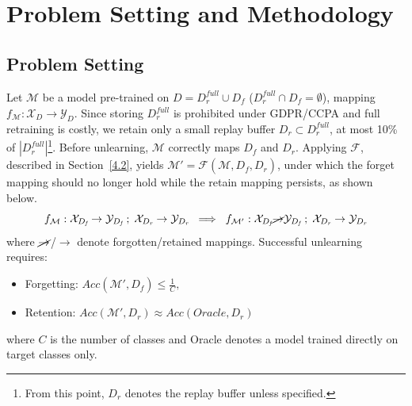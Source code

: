 
\section{Problem Setting and Methodology}
\label{sec:4}

\subsection{Problem Setting}
Let $\mathcal{M}$ be a model pre-trained on $D = D_\textit{r}^{\textit{full}} \cup D_\textit{f}$ ($D_\textit{r}^{\textit{full}} \cap D_\textit{f} = \emptyset$), mapping $f_\mathcal{M} : \mathcal{X}_D \rightarrow \mathcal{Y}_D$. Since storing $D_\textit{r}^{\textit{full}}$ is prohibited under GDPR/CCPA and full retraining is costly, we retain only a small replay buffer $D_\textit{r} \subset D_\textit{r}^{\textit{full}}$, at most 10\% of $|D_\textit{r}^{\textit{full}}|$\footnote{From this point, $D_\textit{r}$ denotes the replay buffer unless specified.}. Before unlearning, $\mathcal{M}$ correctly maps $D_\textit{f}$ and $D_\textit{r}$. Applying $\mathcal{F}$, described in Section~\ref{4.2}, yields $\mathcal{M}' = \mathcal{F}(\mathcal{M}, D_\textit{f}, D_\textit{r})$, under which the forget mapping should no longer hold while the retain mapping persists, as shown below.
{\small
\begin{equation}
f_{\mathcal{M}} :
\mathcal{X}_{D_\textit{f}} \rightarrow \mathcal{Y}_{D_\textit{f}} \; ; \;
\mathcal{X}_{D_\textit{r}} \rightarrow \mathcal{Y}_{D_\textit{r}}
\;\;\Longrightarrow\;\;
f_{\mathcal{M}'} :
\mathcal{X}_{D_\textit{f}} \cancel{\rightarrow} \mathcal{Y}_{D_\textit{f}} \; ; \;
\mathcal{X}_{D_\textit{r}} \rightarrow \mathcal{Y}_{D_\textit{r}}
\label{eq:mapping}
\end{equation}
}
where $\cancel{\rightarrow}$/$\rightarrow$ denote forgotten/retained mappings. Successful unlearning requires:
\begin{itemize}
    \item Forgetting: $\textit{Acc}(\mathcal{M}', D_\textit{f}) \leq \frac{1}{C}, $
    \item Retention: $\textit{Acc}(\mathcal{M}', D_\textit{r}) \approx \textit{Acc}(\textit{Oracle}, D_\textit{r})$
\end{itemize}
where $C$ is the number of classes and Oracle denotes a model trained directly on target classes only.

